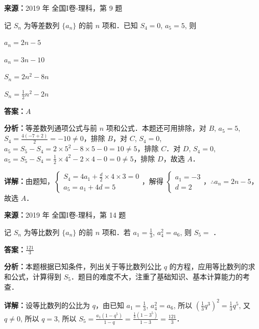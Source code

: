 \begin{question}[points=5]
\textbf{来源：}2019 年 全国I卷-理科，第 9 题\par
记 $S_n$ 为等差数列 $\{a_n\}$ 的前 $n$ 项和．已知 $S_4 = 0$, $a_5 = 5$, 则
\begin{choices}
  \item $a_n = 2n - 5$
  \item $a_n = 3n - 10$
  \item $S_n = 2n^2 - 8n$
  \item $S_n = \frac{1}{2}n^2 - 2n$
\end{choices}
\begin{solution}
\textbf{答案：}$A$

\textbf{分析：}等差数列通项公式与前 $n$ 项和公式．本题还可用排除，对 $B$, $a_5 = 5$, $S_4 = \frac{4(-7 + 2)}{2} = -10 \neq 0$，排除 $B$，对 $C$, $S_4 = 0$, $a_5 = S_5 - S_4 = 2 \times 5^2 - 8 \times 5 - 0 = 10 \neq 5$，排除 $C$．对 $D$, $S_4 = 0$, $a_5 = S_5 - S_4 = \frac{1}{2} \times 4^2 - 2 \times 4 - 0 = 0 \neq 5$，排除 $D$，故选 $A$．

\textbf{详解：}由题知，$\begin{cases} S_4 = 4a_1 + \frac{d}{2} \times 4 \times 3 = 0 \\ a_5 = a_1 + 4d = 5 \end{cases}$，解得 $\begin{cases} a_1 = -3 \\ d = 2 \end{cases}$，$\therefore a_n = 2n - 5$，故选 $A$．
\end{solution}
\end{question}

\begin{question}[points=5]
\textbf{来源：}2019 年 全国I卷-理科，第 14 题\par
记 $S_n$ 为等比数列 $\{a_n\}$ 的前 $n$ 项和．若 $a_1 = \frac{1}{3}$, $a_4^2 = a_6$, 则 $S_5 =$ ．
\fillin[{$\frac{121}{3}$}]
\begin{solution}
\textbf{答案：}$\frac{121}{3}$

\textbf{分析：}本题根据已知条件，列出关于等比数列公比 $q$ 的方程，应用等比数列的求和公式，计算得到 $S_5$．题目的难度不大，注重了基础知识、基本计算能力的考查．

\textbf{详解：}设等比数列的公比为 $q$，由已知 $a_1 = \frac{1}{3}$, $a_4^2 = a_6$, 所以 $\left(\frac{1}{3}q^3\right)^2 = \frac{1}{3}q^5$, 又 $q \neq 0$, 所以 $q = 3$, 所以 $S_5 = \frac{a_1(1 - q^5)}{1 - q} = \frac{\frac{1}{3}(1 - 3^5)}{1 - 3} = \frac{121}{3}$．
\end{solution}
\end{question}

